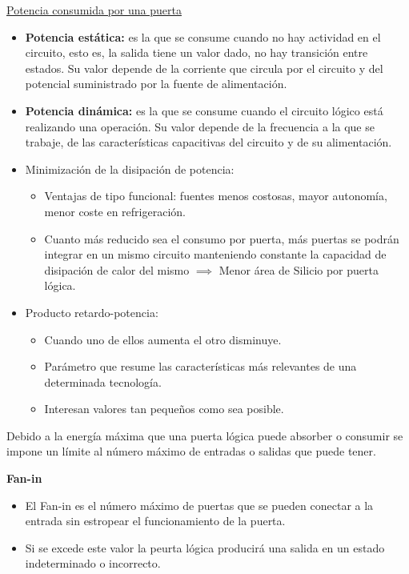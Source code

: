 \documentclass[10pt,a4paper]{article}
\begin{document}
	
	\vspace{0.5cm}
	\underline{{\large Potencia consumida por una puerta}}
	\newline
	\begin{itemize}
		\item \textbf{Potencia estática: }es la que se consume cuando no hay actividad en el circuito, esto es, la salida tiene un valor dado, no hay transición entre estados. Su valor depende de la corriente que circula por el circuito y del potencial suministrado por la fuente de alimentación.
		\item \textbf{Potencia dinámica: }es la que se consume cuando el circuito lógico está realizando una operación. Su valor depende de la frecuencia a la que se trabaje, de las características capacitivas del circuito y de su alimentación.

		\item Minimización de la disipación de potencia:
		\begin{itemize}
			\item Ventajas de tipo funcional: fuentes menos costosas, mayor autonomía, menor coste en refrigeración.
			\item Cuanto más reducido sea el consumo por puerta, más puertas se podrán integrar en un mismo circuito manteniendo constante la capacidad de disipación de calor del mismo $\implies$ Menor área de Silicio por puerta lógica.
		\end{itemize}
		\item Producto retardo-potencia:
		\begin{itemize}
			\item Cuando uno de ellos aumenta el otro disminuye.
			\item Parámetro que resume las características más relevantes de una determinada tecnología.
			\item Interesan valores tan pequeños como sea posible.
		\end{itemize}
	\end{itemize}
	\vspace{0.5cm}
	Debido a la energía máxima que una puerta lógica puede absorber o consumir se impone un límite al número máximo de entradas o salidas que puede tener. \newline
	
	\textbf{Fan-in}
	\begin{itemize}
		\item El Fan-in es el número máximo de puertas que se pueden conectar a la entrada sin estropear el funcionamiento de la puerta.
		\item Si se excede este valor la peurta lógica producirá una salida en un estado indeterminado o incorrecto.
	\end{itemize}	
	
\end{document}
